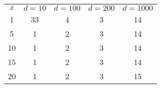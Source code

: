 \begin{tabular}{ccccc}
\hline
 $x$ & $d=10$ & $d=100$ & $d=200$ & $d=1000$ \\
 1 &33 &4 &3 &14\\
 5 &1 &2 &3 &14\\
10 &1 &2 &3 &14\\
15 &1 &2 &3 &14\\
20 &1 &2 &3 &15\\
\hline
\end{tabular}
